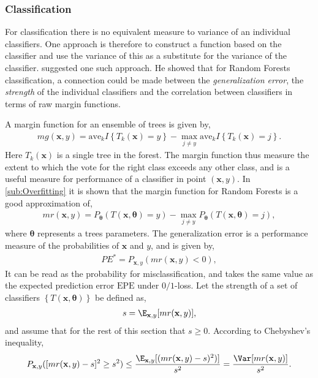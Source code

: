 \subsubsection{Classification}
\label{sub:Classification}
For classification there is no equivalent measure to variance of an individual classifiers. One approach is therefore to construct a function based on the classifier and use the variance of this as a substitute for the variance of the classifier. 
\cite{randomforests} suggested one such approach. He showed that for Random Forests classification, a connection could be made between the \textit{generalization error}, the \textit{strength} of the individual classifiers and the correlation between classifiers in terms of raw margin functions. 

A margin function for an ensemble of trees is given by,
\begin{align}
  mg(\mathbf{x}, y) = \mathrm{ave}_k I\left\{ T_k(\mathbf{x}) = y \right\} - 
  \max_{j \neq y} \mathrm{ave}_k I\left\{ T_k(\mathbf{x}) = j \right\}.
\end{align}
Here $T_k(\mathbf{x})$ is a single tree in the forest. 
The margin function thus measure the extent to which the vote for the right class exceeds any other class, and is a useful measure for performance of a classifier in point $(\mathbf{x}, y)$.  
In \ref{sub:Overfitting} it is shown that the margin function for Random Forests is a good approximation of,
\begin{align}
  mr(\mathbf{x}, y) = P_{\bm \theta} (T(\mathbf{x}, \bm \theta) = y) - \max_{j \neq y} P_{\bm \theta}(T(\mathbf{x}, \bm \theta) = j), 
\end{align}
where $\bm \theta$ represents a trees parameters.
The generalization error is a performance measure of the probabilities of $\mathbf{x}$ and $y$, and is given by,
\begin{align}
  PE^* = P_{\mathbf{x}, y}(mr(\mathbf{x}, y) < 0),
\end{align}
It can be read as the probability for misclassification, and takes the same value as the expected prediction error $\mathrm{EPE}$ under $0/1$-loss. 
Let the strength of a set of classifiers $\left\{ T(\mathbf{x}, \bm \theta) \right\}$ be defined as,
\begin{align}
  s = \E_{\mathbf{x}, y} [mr(\mathbf{x}, y)],
\end{align}
and assume that for the rest of this section that $s \geq 0$.  
According to Chebyshev's inequality,
\begin{align}
  P_{\mathbf{x}, y} ([mr(\mathbf{x}, y)-s]^2 \geq s^2) \leq 
  \frac{\E_{\mathbf{x},y}[(mr(\mathbf{x}, y) - s)^2)]}{s^2} =
  \frac{\Var[mr(\mathbf{x}, y)]}{s^2}.
\end{align}
